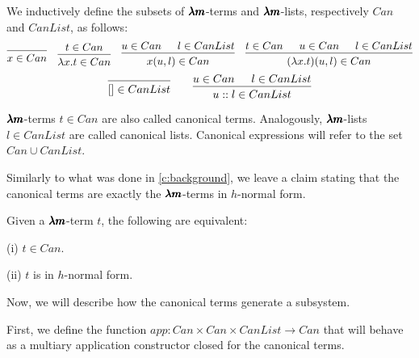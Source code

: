 \begin{definition}
  \label{canonical_terms}
  We inductively define the subsets of $\pmb{\lambda m}$-terms and $\pmb{\lambda m}$-lists, respectively $Can$ and $CanList$, as follows:
  \[
    \begin{prooftree}
      \infer0{ x \in Can } 
    \end{prooftree}
    \quad
    \begin{prooftree}
      \hypo{ t \in Can }
      \infer1{ \lambda x . t \in Can } 
    \end{prooftree}
    \quad
    \begin{prooftree}
      \hypo{ u \in Can }            
      \hypo{ l \in CanList }
      \infer2{ x(u, l) \in Can }
    \end{prooftree}
    \quad
    \begin{prooftree}
      \hypo{ t \in Can } 
      \hypo{ u \in Can }            
      \hypo{ l \in CanList }
      \infer3{ (\lambda x. t)(u, l) \in Can }
    \end{prooftree}
  \]
  \[
    \begin{prooftree}
      \infer0{ [] \in CanList } 
    \end{prooftree}
    \qquad
    \begin{prooftree}
      \hypo{ u \in Can }            
      \hypo{ l \in CanList }
      \infer2{ u::l \in CanList }
    \end{prooftree}
  \]

  $\pmb{\lambda m}$-terms $t \in Can$ are also called canonical terms.
  Analogously, $\pmb{\lambda m}$-lists $l \in CanList$ are called canonical lists.
  Canonical expressions will refer to the set $Can \cup CanList$.
\end{definition}

Similarly to what was done in \cref{c:background}, we leave a claim stating that the canonical terms are exactly the $\pmb{\lambda m}$-terms in $h$-normal form.

\begin{claim}
  Given a $\pmb{\lambda m}$-term $t$, the following are equivalent:

  (i) $t \in Can$.

  (ii) $t$ is in $h$-normal form.
\end{claim}

Now, we will describe how the canonical terms generate a subsystem.

First, we define the function $app : Can \times Can \times CanList \to Can$ that will behave as a multiary application constructor closed for the canonical terms.

